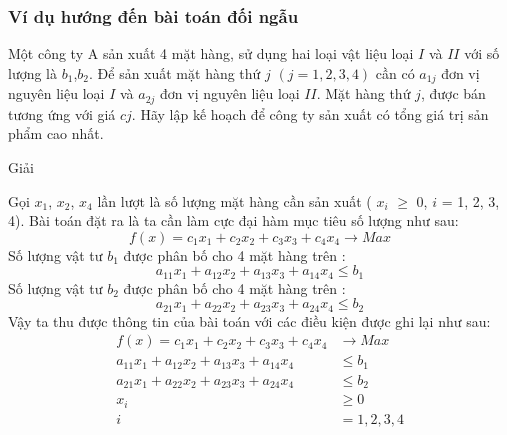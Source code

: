 \documentclass{article}
\begin{document}
        \subsubsection{Ví dụ hướng đến bài toán đối ngẫu}
            Một công ty A sản xuất 4 mặt hàng, sử dụng hai loại vật liệu loại $I$ và $II$ với số lượng là $b_1$,$b_2$. Để sản xuất mặt hàng thứ $j$ \: $(j=1,2,3,4)$ cần có $a_{1j}$  đơn vị nguyên liệu loại $I$ và $a_{2j}$ đơn vị nguyên liệu loại $II$. Mặt hàng thứ $j$, được bán tương ứng với giá $cj$. Hãy lập kế hoạch để công ty sản xuất có tổng giá trị sản phẩm cao nhất.
            \begin{center}
                Giải
            \end{center}
            Gọi $x_1$, $x_2$, $x_4$ lần lượt là số lượng mặt hàng cần sản xuất ( $x_i$ $\geq$ 0, $i$ = 1, 2, 3, 4). Bài toán đặt ra là ta cần làm cực đại hàm mục tiêu số lượng như sau: \\
                \begin{equation}
                    f(x)=c_1x_1+c_2x_2+c_3x_3+c_4x_4 \rightarrow Max
                \end{equation}
            Số lượng vật tư $b_1$ được phân bố cho 4 mặt hàng trên : \\
                \begin{equation}
                    a_{11}x_1+a_{12}x_2+a_{13}x_3+a_{14}x_4 \leq b_1
                \end{equation}
            Số lượng vật tư $b_2$ được phân bố cho 4 mặt hàng trên :
                \begin{equation}
                    a_{21}x_1+a_{22}x_2+a_{23}x_3+a_{24}x_4 \leq b_2
                \end{equation}
            Vậy ta thu được thông tin của bài toán với các điều kiện được ghi lại như sau:
                \begin{equation}
                    \begin{split}
                    f(x)=c_1x_1+c_2x_2+c_3x_3+c_4x_4 &\rightarrow Max \\
                    a_{11}x_1+a_{12}x_2+a_{13}x_3+a_{14}x_4 &\leq b_1 \\
                    a_{21}x_1+a_{22}x_2+a_{23}x_3+a_{24}x_4 &\leq b_2 \\
                    x_i &\geq 0 \\
                    i &= 1, 2, 3, 4
                    \end{split}
                \end{equation}
\end{document}
